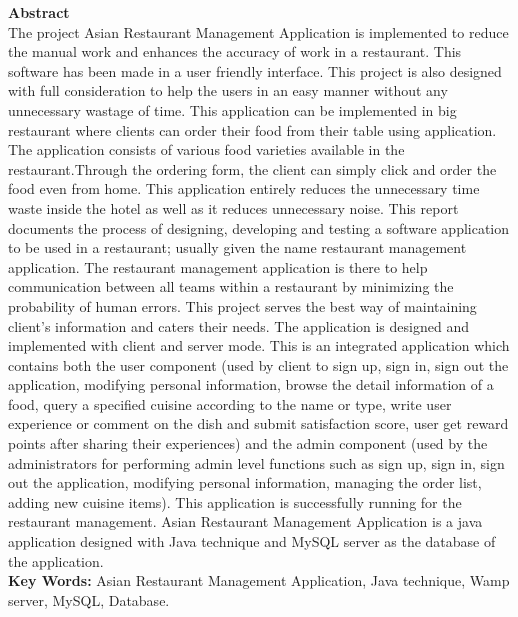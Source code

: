 \documentclass[12pt,a4paper]{article}
\newcommand\tab[1][1cm]{\hspace*{#1}}
\begin{document}
	\begin{titlepage}
		\centering 
		{\fontsize{16}{10}\selectfont \textbf{Abstract}}\\
		\vspace{0.6cm}
		\RaggedRight \tab The project Asian Restaurant Management Application is implemented to reduce the
manual work and enhances the accuracy of work in a restaurant. This software has been made
in a user friendly interface. This project is also designed with full consideration to help the
users in an easy manner without any unnecessary wastage of time. This application can be
implemented in big restaurant where clients can order their food from their table using
application. The application consists of various food varieties available in the restaurant.Through the ordering form, the client can simply click and order the food even from
home. This application entirely reduces the unnecessary time waste inside the hotel as well as
it reduces unnecessary noise. This report documents the process of designing, developing and
testing a software application to be used in a restaurant; usually given the name restaurant
management application. The restaurant management application is there to help
communication between all teams within a restaurant by minimizing the probability of human
errors. This project serves the best way of maintaining client’s information and caters
their needs. The application is designed and implemented with client and server mode. This is
an integrated application which contains both the user component (used by client to sign up,
sign in, sign out the application, modifying personal information, browse the detail
information of a food, query a specified cuisine according to the name or type, write user
experience or comment on the dish and submit satisfaction score, user get reward points after
sharing their experiences) and the admin component (used by the administrators for
performing admin level functions such as sign up, sign in, sign out the application, modifying
personal information, managing the order list, adding new cuisine items). This application is
successfully running for the restaurant management. Asian Restaurant Management
Application is a java application designed with Java technique and MySQL server as the
database of the application.\\
\vspace{0.8cm}
{\bfseries Key Words: } Asian Restaurant Management Application, Java technique, Wamp server, MySQL, Database.

\end{titlepage}
\end{document}

